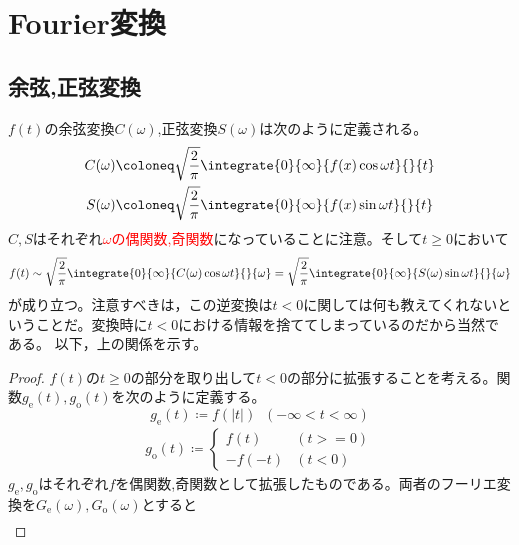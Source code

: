 \chapter{Fourier変換}
    \section{余弦,正弦変換}
    {%
        \renewcommand{\ge}{g_\textrm{e}}
        \newcommand{\go}{g_\textrm{o}}
        \newcommand{\Ge}{G_\textrm{e}}
        \newcommand{\Go}{G_\textrm{o}}
        $f(t)$の余弦変換$C(\omega)$,正弦変換$S(\omega)$は次のように定義される。
        \begin{align*}
            C(\omega) &\coloneq \sqrt{\frac{2}{\pi}}\integrate{0}{\infty}{f(x)\cos{\omega t}}{}{t}\\
            S(\omega) &\coloneq \sqrt{\frac{2}{\pi}}\integrate{0}{\infty}{f(x)\sin{\omega t}}{}{t}
        \end{align*}
        $C,S$はそれぞれ\textcolor{red}{$\omega$の偶関数,奇関数}になっていることに注意。そして$t\geq0$において
        \begin{equation}
            f(t) \sim \sqrt{\frac{2}{\pi}}\integrate{0}{\infty}{C(\omega)\cos{\omega t}}{}{\omega} = \sqrt{\frac{2}{\pi}}\integrate{0}{\infty}{S(\omega)\sin{\omega t}}{}{\omega} \nonumber
        \end{equation}
        が成り立つ。注意すべきは，この逆変換は$t<0$に関しては何も教えてくれないということだ。変換時に$t<0$における情報を捨ててしまっているのだから当然である。
        以下，上の関係を示す。
        \newline\par
        \begin{proof}
            \quad\par
            $f(t)$の$t\geq0$の部分を取り出して$t<0$の部分に拡張することを考える。関数$\ge(t),\go(t)$を次のように定義する。
            \[\ge(t) \coloneq f(|t|)\;\;(-\infty<t<\infty)\]
            \begin{align}
                \go(t) \coloneq
                \begin{cases}
                    f(t) & (t>=0) \\
                    -f(-t) & (t<0)
                \end{cases}
                \nonumber
            \end{align}
            $\ge,\go$はそれぞれ$f$を偶関数,奇関数として拡張したものである。両者のフーリエ変換を$\Ge(\omega),\Go(\omega)$とすると
            \begin{align*}

\end{align*}
\end{proof}}

